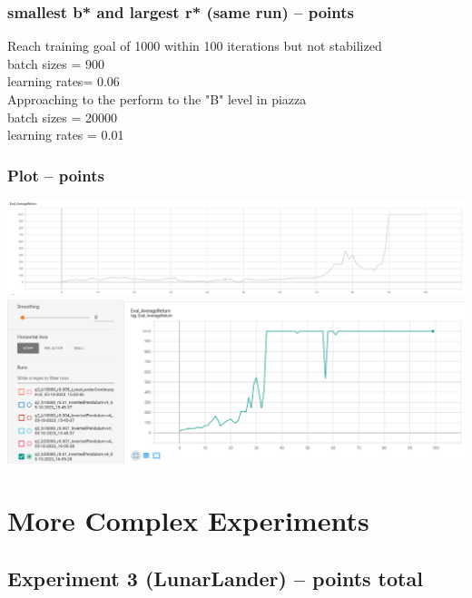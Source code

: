 \documentclass{article}
\begin{document}
\subsubsection{smallest \textbf{b*} and largest \textbf{r*} (same run) --  points\rbrack}
\begin{answer}[title=Q5.2.2,height=4cm,width=\linewidth]
Reach training goal of 1000 within 100 iterations but not stabilized \\
batch sizes = 900 \\
learning rates= 0.06 
\\
Approaching to the perform to the "B" level in piazza \\
batch sizes = 20000 \\
learning rates = 0.01  \\
\end{answer}

\subsubsection{Plot --  points\rbrack}
\begin{answer}[title=Q5.2.3,height=10cm,width=\linewidth]
\centering
\includegraphics[width=0.9\linewidth]{Images/q2_b900_r0.06.png}
\includegraphics[width=0.9\linewidth]{Images/q2_b20000_r0.01.png}
\end{answer}

\setcounter{section}{6}
\section{More Complex Experiments}

\subsection{Experiment 3 (LunarLander) --  points total\rbrack}
\end{document}
